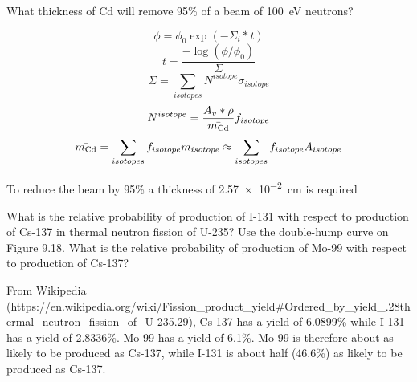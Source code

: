 \documentclass{hw}
\begin{document}
What thickness of Cd will remove 95\% of a beam of \SI{100}{\electronvolt} neutrons?

\solution
$$ \phi = \phi_0 \exp{\left(-\Sigma_i * t\right)} $$
$$ t = \frac{-\log \left(\phi / \phi_0 \right) }{\Sigma} $$
$$ \Sigma = \sum_{isotopes} N^{isotope} \sigma_{isotope} $$
$$ N^{isotope} = \frac{A_v * \rho}{\bar{m_{\ce{Cd}}}} f_{isotope} $$
$$ \bar{m_{\ce{Cd}}} = \sum_{isotopes} f_{isotope} m_{isotope} \approx \sum_{isotopes} f_{isotope} A_{isotope} $$

To reduce the beam by 95\% a thickness of \SI{2.57e-2}{\centi\meter} is required

\problem{}
What is the relative probability of production of I-131 with respect to production of Cs-137 in thermal neutron fission of U-235? Use the double-hump curve on Figure 9.18. What is the relative probability of production of Mo-99 with respect to production of Cs-137?

\solution
From Wikipedia (https://en.wikipedia.org/wiki/Fission_product_yield#Ordered_by_yield_.28thermal_neutron_fission_of_U-235.29), Cs-137 has a yield of 6.0899\% while I-131 has a yield of 2.8336\%. Mo-99 has a yield of 6.1\%. Mo-99 is therefore about as likely to be produced as Cs-137, while I-131 is about half (46.6\%) as likely to be produced as Cs-137.
\end{document}
